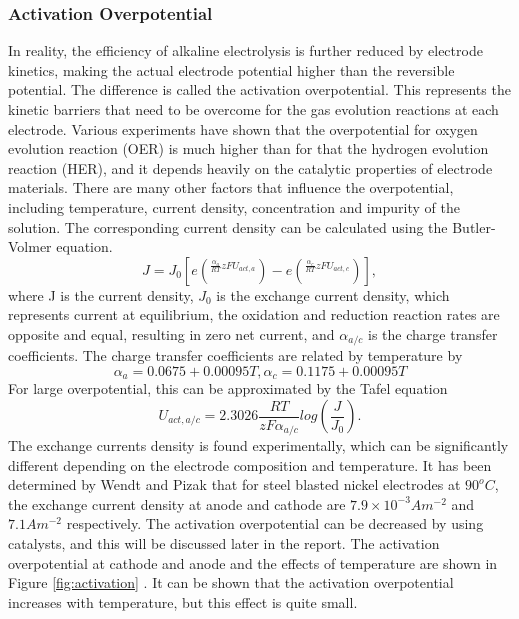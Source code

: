 \subsubsection{Activation Overpotential}
In reality, the efficiency of alkaline electrolysis is further reduced by electrode kinetics, making the actual electrode potential higher than the reversible potential. The difference is called the activation overpotential. This represents the kinetic barriers that need to be overcome for the gas evolution reactions at each electrode. Various experiments have shown that the overpotential for oxygen evolution reaction (OER) is much higher than for that the hydrogen evolution reaction (HER), and it depends heavily on the catalytic properties of electrode materials. \cite{activation} There are many other factors that influence the overpotential, including temperature, current density, concentration and impurity of the solution.
The corresponding current density can be calculated using the Butler-Volmer equation. \cite{activation1}
\begin{equation} 
J = J_0 [e(^{\frac{\alpha_a}{RT}zFU_{act,a}}) - e(^{\frac{\alpha_c}{RT}zFU_{act,c}})],
\end{equation}
where J is the current density, $J_0$ is the exchange current density, which represents current at equilibrium, the oxidation and reduction reaction rates are opposite and equal, resulting in zero net current, and  $\alpha_{a/c}$ is the charge transfer coefficients. The charge transfer coefficients are related by temperature by
\begin{equation} 
\alpha_a = 0.0675 + 0.00095T, \alpha_c = 0.1175+0.00095T
\end{equation} 
For large overpotential, this can be approximated by the Tafel equation\cite{activation2} 
\begin{equation} 
U_{act,a/c} = 2.3026 \frac{RT}{zF\alpha_{a/c}} log(\frac{J}{J_0}).
\end{equation}
The exchange currents density is found experimentally, which can be significantly different depending on the electrode composition and temperature. It has been determined by Wendt and Pizak that for steel blasted nickel electrodes at $90^oC$, the exchange current density at anode and cathode are $7.9 \times10^{-3}Am^{-2}$ and $7.1Am^{-2}$ respectively. \cite{activation3} The activation overpotential can be decreased by using catalysts, and this will be discussed later in the report. The activation overpotential at cathode and anode and the effects of temperature are shown in Figure \ref{fig:activation} . It can be shown that the activation overpotential increases with temperature, but this effect is quite small.

